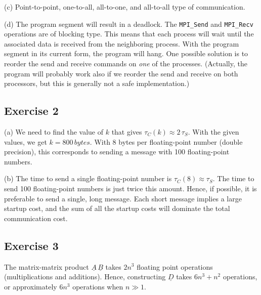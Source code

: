 \documentclass[11pt]{article}
\begin{document}
(c) Point-to-point, one-to-all, all-to-one, and all-to-all 
type of communication.

(d) The program segment will result in a deadlock.
The \texttt{\small MPI\_Send} and \texttt{\small MPI\_Recv} operations
are of blocking type. This means that each process will wait 
until the associated data is received from the neighboring process.
With the program segment in its current form, the program will hang. 
One possible solution is to reorder the send and receive 
commands on {\em one} of the processes. 
(Actually, the program will probably work also if we reorder
the send and receive on both processors, but this is generally 
not a safe implementation.)


\subsection*{Exercise 2}

(a) We need to find  the value of $k$ that gives $\tau_C(k) \approx 2\,\tau_S$.
With the given values, we get $k=800 \, bytes$. With 8 bytes per
floating-point number (double precision), this corresponds to sending 
a message with 100 floating-point numbers.

(b) The time to send a single floating-point number is 
$\tau_C(8) \approx \tau_S$.
The time to send 100 floating-point numbers is just twice this amount. 
Hence, if possible, it is preferable to send a single, long message. 
Each short message implies a large startup cost, 
and the sum of all the startup costs will dominate 
the total communication cost.

\subsection*{Exercise 3}

The matrix-matrix product $\underline{A}\,\underline{B}$ takes $2n^3$ floating point operations (multiplications and additions). 
Hence, constructing $\underline{D}$ takes $6n^3 + n^2$ operations, 
or approximately $6n^3$ operations when $n\gg 1$. 
\end{document}
